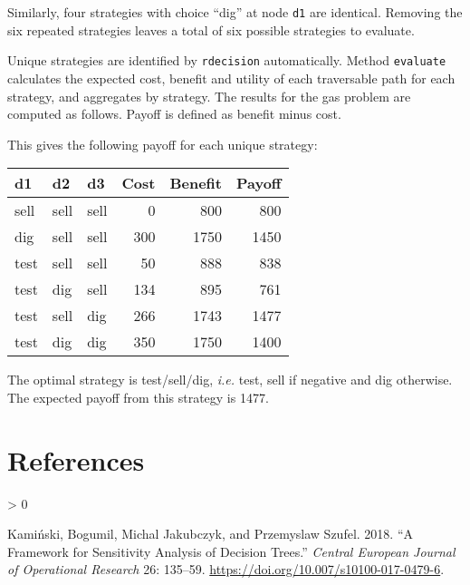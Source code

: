 \documentclass[
]{article}
\newenvironment{Shaded}{\begin{snugshade}}{\end{snugshade}}
\newcommand{\CommentTok}[1]{\textcolor[rgb]{0.56,0.35,0.01}{\textit{#1}}}
\newcommand{\FunctionTok}[1]{\textcolor[rgb]{0.00,0.00,0.00}{#1}}
\newcommand{\NormalTok}[1]{#1}
\newcommand{\OtherTok}[1]{\textcolor[rgb]{0.56,0.35,0.01}{#1}}
\newcommand{\SpecialCharTok}[1]{\textcolor[rgb]{0.00,0.00,0.00}{#1}}
\newlength{\cslhangindent}
\newenvironment{CSLReferences}[2] %
 {%
  \setlength{\parindent}{0pt}
  \ifodd #1 \everypar{\setlength{\hangindent}{\cslhangindent}}\ignorespaces\fi
  \ifnum #2 > 0
  \setlength{\parskip}{#2\baselineskip}
  \fi
 }%
 {}
\begin{document}
Similarly, four strategies with choice ``dig'' at node \texttt{d1} are
identical. Removing the six repeated strategies leaves a total of six
possible strategies to evaluate.

Unique strategies are identified by \texttt{rdecision} automatically.
Method \texttt{evaluate} calculates the expected cost, benefit and
utility of each traversable path for each strategy, and aggregates by
strategy. The results for the gas problem are computed as follows.
Payoff is defined as benefit minus cost.

\begin{Shaded}
\end{Shaded}

This gives the following payoff for each unique strategy:

\begin{longtable}[]{@{}lllrrr@{}}
\toprule
d1 & d2 & d3 & Cost & Benefit & Payoff\tabularnewline
\midrule
\endhead
sell & sell & sell & 0 & 800 & 800\tabularnewline
dig & sell & sell & 300 & 1750 & 1450\tabularnewline
test & sell & sell & 50 & 888 & 838\tabularnewline
test & dig & sell & 134 & 895 & 761\tabularnewline
test & sell & dig & 266 & 1743 & 1477\tabularnewline
test & dig & dig & 350 & 1750 & 1400\tabularnewline
\bottomrule
\end{longtable}

The optimal strategy is test/sell/dig, \emph{i.e.} test, sell if
negative and dig otherwise. The expected payoff from this strategy is
1477.

\hypertarget{references}{%
\section*{References}\label{references}}

\hypertarget{refs}{}
\begin{CSLReferences}{1}{0}
\leavevmode\hypertarget{ref-kaminski:2018a}{}%
Kamiński, Bogumil, Michal Jakubczyk, and Przemyslaw Szufel. 2018. {``A
Framework for Sensitivity Analysis of Decision Trees.''} \emph{Central
European Journal of Operational Research} 26: 135--59.
\url{https://doi.org/10.007/s10100-017-0479-6}.

\end{CSLReferences}
\end{document}
